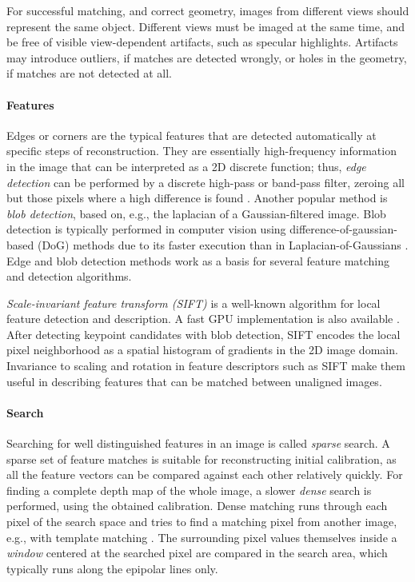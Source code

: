 For successful matching, and correct geometry, images from different views should represent the same object.
Different views must be imaged at the same time, and be free of visible view-dependent artifacts, such as specular highlights.
Artifacts may introduce outliers, if matches are detected wrongly, or holes in the geometry, if matches are not detected at all.

\paragraph{Features}
Edges or corners are the typical features that are detected automatically at specific steps of reconstruction.
They are essentially high-frequency information in the image that can be interpreted as a 2D discrete function;
thus, \emph{edge detection} can be performed by a discrete high-pass or band-pass filter, zeroing all but those pixels where a high difference is found \cite{marr1980theory}.
Another popular method is \emph{blob detection}, based on, e.g., the laplacian of a Gaussian-filtered image.
Blob detection is typically performed in computer vision using difference-of-gaussian-based (DoG) methods due to its faster execution than in Laplacian-of-Gaussians \cite[p. 152]{szeliski10vision}.
Edge and blob detection methods work as a basis for several feature matching and detection algorithms.

\emph{Scale-invariant feature transform (SIFT)} \cite{lowe1999object} is a well-known algorithm for local feature detection and description.
A fast GPU implementation is also available \cite{changchang2007siftgpu}.
After detecting keypoint candidates with blob detection, SIFT encodes the local pixel neighborhood as a spatial histogram of gradients in the 2D image domain.
Invariance to scaling and rotation in feature descriptors such as SIFT make them useful in describing features that can be matched between unaligned images.

\paragraph{Search}
Searching for well distinguished features in an image is called \emph{sparse} search.
A sparse set of feature matches is suitable for reconstructing initial calibration, as all the feature vectors can be compared against each other relatively quickly.
For finding a complete depth map of the whole image, a slower \emph{dense} search is performed, using the obtained calibration.
Dense matching runs through each pixel of the search space and tries to find a matching pixel from another image, e.g., with template matching \cite{duda1973pattern}.
The surrounding pixel values themselves inside a \emph{window} centered at the searched pixel are compared in the search area, which typically runs along the epipolar lines only.

